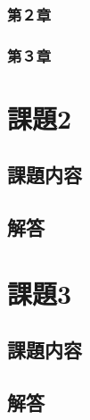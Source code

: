 \documentclass{article}[jsarticle]
\begin{document}
\subsubsection{第２章}
\subsubsection{第３章}

\section{課題2}
\subsection{課題内容}
\subsection{解答}

\section{課題3}
\subsection{課題内容}
\subsection{解答}
\end{document}
